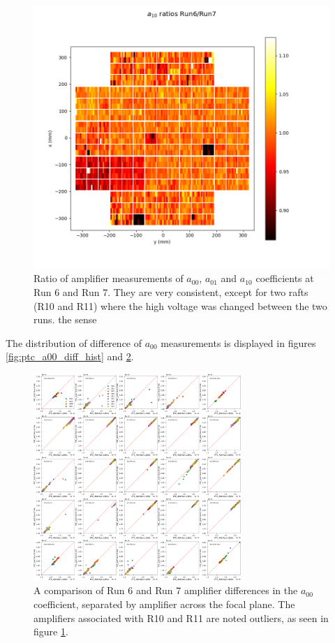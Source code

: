 \begin{figure}[ht]
\begin{centering}
  \includegraphics[width=\linewidth]{figures/baselineCharacterization/a10_ratios.png}
  \endminipage\hfill
  

\caption{Ratio of amplifier measurements of $a_{00}$, $a_{01}$ and $a_{10}$ coefficients at Run 6 and Run 7. They are very consistent, except for two rafts (R10 and R11) where the high voltage was changed between the two runs. the sense \label{fig:ratio_bf_coeff_6_7}}
  \end{centering}
  \end{figure}

The distribution of difference of $a_{00}$ measurements is displayed in figures \ref{fig:ptc_a00_diff_hist} and \ref{fig:ptc_a00_5x5}.

\begin{figure}[ht]
\begin{centering}
\includegraphics[width=0.7\textwidth]{figures/baselineCharacterization/13591_E749_PTC_A00.png}
\caption{A comparison of Run 6 and Run 7 amplifier differences in the $a_{00}$ coefficient, separated by amplifier across the focal plane. The amplifiers associated with R10 and R11 are noted outliers, as seen in figure \ref{fig:ratio_bf_coeff_6_7}.}
\label{fig:ptc_a00_5x5}
\end{centering}
\end{figure}

